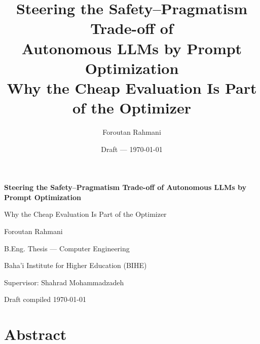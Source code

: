 \documentclass[11pt,a4paper,oneside]{report}
\title{\textbf{Steering the Safety--Pragmatism Trade-off of\\ Autonomous LLMs by Prompt Optimization}\\[0.4em]
{\large Why the Cheap Evaluation Is Part of the Optimizer}}
\author{Foroutan Rahmani}
\date{Draft --- \today}
\begin{document}
\begin{titlepage}
\centering
\vspace*{2cm}
{\LARGE\bfseries Steering the Safety--Pragmatism Trade-off of Autonomous LLMs by Prompt Optimization\par}
\vspace{0.5cm}
{\large Why the Cheap Evaluation Is Part of the Optimizer\par}
\vspace{2cm}
{\large Foroutan Rahmani\par}
\vspace{0.5cm}
{\normalsize B.Eng. Thesis --- Computer Engineering\par}
\vspace{0.3cm}
{\normalsize Baha'i Institute for Higher Education (BIHE)\par}
\vspace{0.3cm}
{\normalsize Supervisor: Shahrad Mohammadzadeh\par}
\vfill
{\normalsize Draft compiled \today\par}
\end{titlepage}


\chapter*{Abstract}


\tableofcontents
\listoffigures
\listoftables

\cleardoublepage
{}











\appendix
\end{document}
